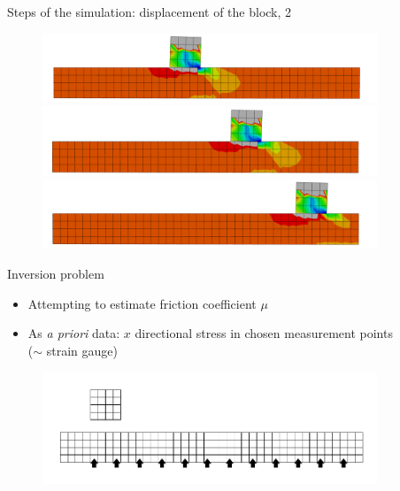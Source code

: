 \documentclass{beamer}
\begin{document}
\begin{frame}{Steps of the simulation: displacement of the block, 2}

\begin{figure}
\includegraphics[width=10cm]{anim3.pdf}\\
\includegraphics[width=10cm]{anim4.pdf}\\
\includegraphics[width=10cm]{anim5.pdf}
\end{figure}

\end{frame}

\begin{frame}{Inversion problem}

\begin{itemize}
\item Attempting to estimate friction coefficient $\mu$
\item As \emph{a priori} data: $x$ directional stress in chosen measurement points\\($\sim$ strain gauge)
\end{itemize}

\begin{figure}
\includegraphics[width=10cm]{fretting_geom_meas.pdf}
\end{figure}


\end{frame}
\end{document}
